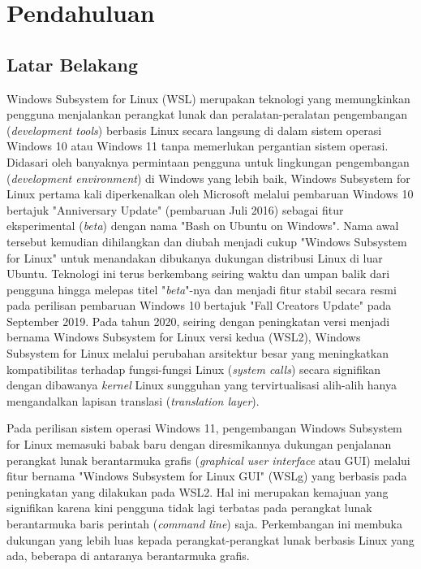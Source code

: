 \chapter{Pendahuluan}

\section{Latar Belakang}

Windows Subsystem for Linux (WSL) merupakan teknologi yang memungkinkan pengguna menjalankan perangkat lunak dan peralatan-peralatan pengembangan (\textit{development tools}) berbasis Linux secara langsung di dalam sistem operasi Windows 10 atau Windows 11 tanpa memerlukan pergantian sistem operasi. Didasari oleh banyaknya permintaan pengguna untuk lingkungan pengembangan (\textit{development environment}) di Windows yang lebih baik, Windows Subsystem for Linux pertama kali diperkenalkan oleh Microsoft melalui pembaruan Windows 10 bertajuk "Anniversary Update" (pembaruan Juli 2016) sebagai fitur eksperimental (\textit{beta}) dengan nama "Bash on Ubuntu on Windows". Nama awal tersebut kemudian dihilangkan dan diubah menjadi cukup "Windows Subsystem for Linux" untuk menandakan dibukanya dukungan distribusi Linux di luar Ubuntu. Teknologi ini terus berkembang seiring waktu dan umpan balik dari pengguna hingga melepas titel "\textit{beta}"-nya dan menjadi fitur stabil secara resmi pada perilisan pembaruan Windows 10 bertajuk "Fall Creators Update" pada September 2019. Pada tahun 2020, seiring dengan peningkatan versi menjadi bernama Windows Subsystem for Linux versi kedua (WSL2), Windows Subsystem for Linux melalui perubahan arsitektur besar yang meningkatkan kompatibilitas terhadap fungsi-fungsi Linux (\textit{system calls}) secara signifikan dengan dibawanya \textit{kernel} Linux sungguhan yang tervirtualisasi alih-alih hanya mengandalkan lapisan translasi (\textit{translation layer}).

Pada perilisan sistem operasi Windows 11, pengembangan Windows Subsystem for Linux memasuki babak baru dengan diresmikannya dukungan penjalanan perangkat lunak berantarmuka grafis (\textit{graphical user interface} atau GUI) melalui fitur bernama "Windows Subsystem for Linux GUI" (WSLg) yang berbasis pada peningkatan yang dilakukan pada WSL2. Hal ini merupakan kemajuan yang signifikan karena kini pengguna tidak lagi terbatas pada perangkat lunak berantarmuka baris perintah (\textit{command line}) saja. Perkembangan ini membuka dukungan yang lebih luas kepada perangkat-perangkat lunak berbasis Linux yang ada, beberapa di antaranya berantarmuka grafis.


